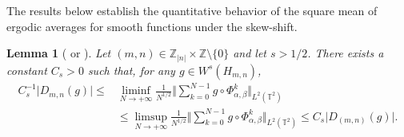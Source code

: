 \documentclass[JEP,XML,SOM,Unicode,NoEqCountersInSection]{cedram}
\theoremstyle{definition}
\theoremstyle{plain}
\newtheorem{lemma}[definition]{Lemma}
\newcommand\TT{\mathbb{T}}
\newcommand\ZZ{\mathbb{Z}}
\begin{document}
The results below establish the quantitative behavior of the square mean of ergodic averages for smooth
functions under the skew-shift.

\begin{lemma}[{\cite[Lem.\,15]{AFU} or \cite[Lem.\,8.1]{FK}}]\label{lemma:L2bounds}
Let $(m,n)\in \ZZ_{\vert n\vert } \times \ZZ\setminus\{0\}$ and let $s>1/2$.
There exists a constant $C_s>0$ such that, for any $g \in W^s(H_{m,n})$,
\begin{equation*}
\begin{aligned}
C_s^{-1} \vert D_{m,n} (g) \vert \leq &\liminf_{N\to +\infty} \frac{ 1} {N^{1/2}} \biggl\Vert \sum_{k=0}^{N-1} g \circ \Phi_{\alpha,\beta}^k
\biggr\Vert_{L^2(\TT^2)} \\
&\leq \limsup_{N\to +\infty} \frac{ 1} {N^{1/2}} \biggl\Vert \sum_{k=0}^{N-1} g \circ \Phi_{\alpha,\beta}^k
\biggr\Vert_{L^2(\TT^2)} \leq C_s \vert D_{(m,n)} (g) \vert.
\end{aligned}
\end{equation*}
\end{lemma}
\end{document}
